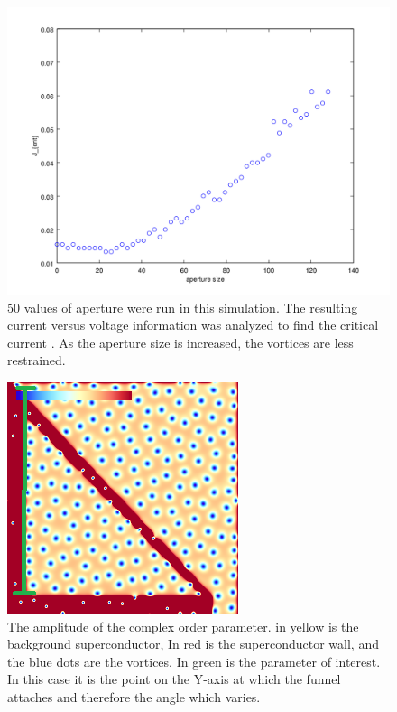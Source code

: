 \begin{figure}[htbp]
\begin{center}
\includegraphics[scale=.50]{oneSidedAperture.png}
\caption{ 50 values of aperture were run in this simulation. The resulting current versus voltage information was analyzed to find the critical current . As the aperture size is increased, the vortices are less restrained. }
\label{normalYscan}
\end{center}
\end{figure}

\begin{figure}[htbp]
\begin{center}
\includegraphics[scale=.50]{oneSidedY.png}
\caption{ The amplitude of the complex order parameter. in yellow is the background superconductor, In red is the superconductor wall, and the blue dots are the vortices. In green is the parameter of interest. In this case it is the point on the Y-axis at which the funnel attaches and therefore the angle which varies.}
\label{oneSidedY}
\end{center}
\end{figure}


